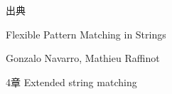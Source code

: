 \documentclass[dvipdfmx,12pt,beamer]{standalone}
\begin{document}
\begin{frame}{出典}
	\begin{description}[style=nextline]
		\item[タイトル] Flexible Pattern Matching in Strings
		\item[著者] Gonzalo Navarro, Mathieu Raffinot
		\item[今回説明する章] 4章 Extended string matching
	\end{description}
\end{frame}
\end{document}
